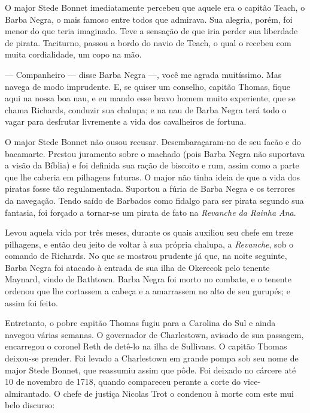O major Stede Bonnet imediatamente percebeu que aquele era o capitão Teach,
o Barba Negra, o mais famoso entre todos que admirava. Sua alegria, porém,
foi menor do que teria imaginado. Teve a sensação de que iria perder sua
liberdade de pirata. Taciturno, passou a bordo do navio de Teach, o qual o
recebeu com muita cordialidade, um copo na mão.

--- Companheiro --- disse Barba Negra ---, você me agrada muitíssimo. Mas navega de
modo imprudente. E, se quiser um conselho, capitão Thomas, fique aqui na
nossa boa nau, e eu mando esse bravo homem muito experiente, que se chama
Richards, conduzir sua chalupa; e na nau de Barba Negra terá todo o vagar
para desfrutar livremente a vida dos cavalheiros de fortuna.

O major Stede Bonnet não ousou recusar. Desemba\-raçaram-no de seu facão e do
bacamarte. Prestou juramento sobre o machado (pois Barba Negra não
suportava a visão da Bíblia) e foi definida sua ração de biscoito e rum,
assim como a parte que lhe caberia em pilhagens futuras. O major não tinha
ideia de que a vida dos piratas fosse tão regulamentada. Suportou a fúria
de Barba Negra e os terrores da navegação. Tendo saído de Barbados como
fidalgo para ser pirata segundo sua fantasia, foi forçado a tornar-se um
pirata de fato na \textit{Revanche da Rainha Ana}.

Levou aquela vida por três meses, durante os quais auxiliou seu chefe em
treze pilhagens, e então deu jeito de voltar à sua própria chalupa, a
\textit{Revanche}, sob o comando de Richards. No que se mostrou prudente
já que, na noite seguinte, Barba Negra foi atacado à entrada de sua ilha
de Okerecok pelo tenente Maynard, vindo de Bathtown. Barba Negra foi morto
no combate, e o tenente ordenou que lhe cortassem a cabeça e a amarrassem
no alto de seu gurupés; e assim foi feito.

Entretanto, o pobre capitão Thomas fugiu para a Carolina do Sul e ainda
navegou várias semanas. O governador de Charlestown, avisado de sua
passagem, encarregou o coronel Reth de detê-lo na ilha de Sullivans. O
capitão Thomas deixou-se prender. Foi levado a Charlestown em grande pompa
sob seu nome de major Stede Bonnet, que reassumiu assim que pôde. Foi
deixado no cárcere até 10 de novembro de 1718, quando compareceu perante a
corte do vice-almirantado. O chefe de justiça Nicolas Trot o condenou à
morte com este mui belo discurso:

